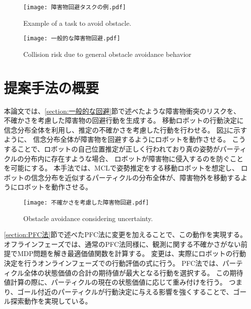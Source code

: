 \begin{figure}[h]
  \begin{center}
    \texttt{[image: 障害物回避タスクの例.pdf]}
    \caption{Example of a task to avoid obstacle.}
    \label{fig:障害物回避タスクの例}
  \end{center}
\end{figure}

\begin{figure}[h]
  \begin{center}
    \texttt{[image: 一般的な障害物回避.pdf]}
    \caption{Collision risk due to general obstacle avoidance behavior}
    \label{fig:一般的な障害物回避}
  \end{center}
\end{figure}


\section{提案手法の概要} \label{section:method overview}
本論文では、\ref{section:一般的な回避}節で述べたような障害物衝突のリスクを、
不確かさを考慮した障害物の回避行動を生成する。
移動ロボットの行動決定に信念分布全体を利用し、推定の不確かさを考慮した行動を行わせる。
図\ref{fig:不確かさを考慮した障害物回避}に示すように、
信念分布全体が障害物を回避するようにロボットを動作させる。
こうすることで、ロボットの自己位置推定が正しく行われており真の姿勢がパーティクルの分布内に存在すような場合、
ロボットが障害物に侵入するのを防ぐことを可能にする。
本手法では、MCLで姿勢推定をする移動ロボットを想定し、
ロボットの信念分布を近似するパーティクルの分布全体が、障害物外を移動するようにロボットを動作させる。

\begin{figure}[h]
  \begin{center}
    \texttt{[image: 不確かさを考慮した障害物回避.pdf]}
    \caption{Obstacle avoidance considering uncertainty.}
    \label{fig:不確かさを考慮した障害物回避}
  \end{center}
\end{figure}

\ref{section:PFC法}節で述べたPFC法に変更を加えることで、この動作を実現する。
オフラインフェーズでは、通常のPFC法同様に、観測に関する不確かさがない前提でMDP問題を解き最適価値関数を計算する。
変更は、実際にロボットの行動決定を行うオンラインフェーズでの行動評価の式に行う。
PFC法では、パーティクル全体の状態価値の合計の期待値が最大となる行動を選択する。
この期待値計算の際に、パーティクルの現在の状態価値に応じて重み付けを行う。
つまり、ゴール付近のパーティクルが行動決定に与える影響を強くすることで、ゴール探索動作を実現している。

